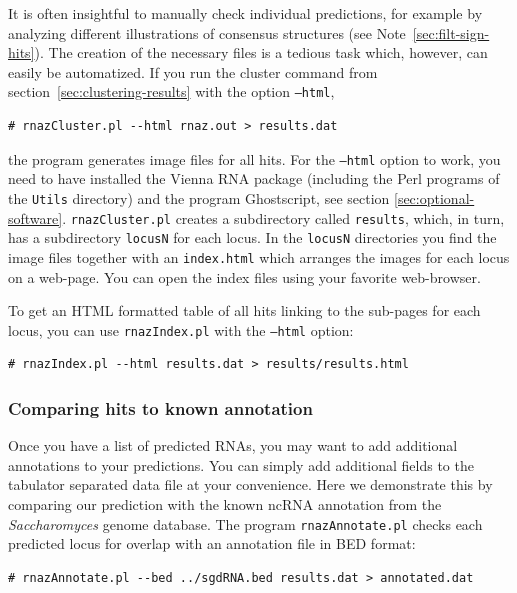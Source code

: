 \documentclass[11pt]{article}
\begin{document}
It is often insightful to manually check individual predictions, for
example by analyzing different illustrations of consensus structures (see
Note~\ref{sec:filt-sign-hits}). The creation of the necessary files is a
tedious task which, however, can easily be automatized. If you run the
cluster command from section~\ref{sec:clustering-results} with the option
\texttt{--html},

\begin{verbatim}
# rnazCluster.pl --html rnaz.out > results.dat 
\end{verbatim}

the program generates image files for all hits. For the \texttt{--html}
option to work, you need to have installed the Vienna RNA package
(including the Perl programs of the \texttt{Utils} directory) and the
program Ghostscript, see section \ref{sec:optional-software}.
\texttt{rnazCluster.pl} creates a subdirectory called \texttt{results},
which, in turn, has a subdirectory \texttt{locusN} for each locus. In the
\texttt{locusN} directories you find the image files together with an
\texttt{index.html} which arranges the images for each locus on a web-page.
You can open the index files using your favorite web-browser.

To get an HTML formatted table of all hits linking to the sub-pages for
each locus, you can use \texttt{rnazIndex.pl} with the \texttt{--html}
option:

\begin{verbatim}
# rnazIndex.pl --html results.dat > results/results.html
\end{verbatim}

\subsubsection{Comparing hits to known annotation}

Once you have a list of predicted RNAs, you may want to add additional
annotations to your predictions. You can simply add additional fields to
the tabulator separated data file at your convenience. Here we demonstrate
this by comparing our prediction with the known ncRNA annotation from the
\emph{Saccharomyces} genome database. The program \texttt{rnazAnnotate.pl}
checks each predicted locus for overlap with an annotation file in BED
format:

\begin{verbatim}
# rnazAnnotate.pl --bed ../sgdRNA.bed results.dat > annotated.dat
\end{verbatim}
\end{document}
